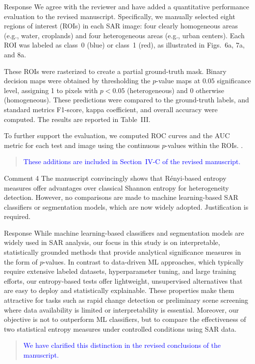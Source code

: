 \documentclass[11pt]{report}
\begin{document}
\begin{responsebox}{Response}
We agree with the reviewer and have added a quantitative performance evaluation to the revised manuscript. Specifically, we manually selected eight regions of interest (ROIs) in each SAR image: four clearly homogeneous areas (e.g., water, croplands) and four heterogeneous areas (e.g., urban centers). Each ROI was labeled as class~0 (blue) or class~1 (red), as illustrated in Figs.~6a, 7a, and 8a.

These ROIs were rasterized to create a partial ground-truth mask. Binary decision maps were obtained by thresholding the $p$-value maps at $ 0.05$ significance level, assigning 1 to pixels with $p < 0.05$ (heterogeneous) and 0 otherwise (homogeneous). These predictions were compared to the ground-truth labels, and standard metrics F1-score, kappa coefficient, and overall accuracy were computed. The results are reported in Table~III.

To further support the evaluation, we computed ROC curves and the AUC metric for each test and image using the continuous $p$-values within the ROIs. .
\begin{quote}
\textcolor{blue}{These additions are included in Section~IV-C of the revised manuscript. }
\end{quote}

\end{responsebox}



\begin{reviewbox}{Comment 4}
The manuscript convincingly shows that Rényi-based entropy measures offer advantages over classical Shannon entropy for heterogeneity detection. However, no comparisons are made to machine learning-based SAR classifiers or segmentation models, which are now widely adopted. Justification is required.
\end{reviewbox}
\begin{responsebox}{Response}
While machine learning-based classifiers and segmentation models are widely used in SAR analysis, our focus in this study is on interpretable, statistically grounded methods that provide analytical significance measures in the form of $p$-values. 
 In contrast to data-driven ML approaches, which typically require extensive labeled datasets, hyperparameter tuning, and large training efforts, our entropy-based tests offer lightweight, unsupervised alternatives that are easy to deploy and statistically explainable. These properties make them attractive for tasks such as rapid change detection or preliminary scene screening where data availability is limited or interpretability is essential. Moreover, our objective is not to outperform ML classifiers, but to compare the effectiveness of two statistical entropy measures under controlled conditions using SAR data.
\begin{quote}
\textcolor{blue}{We have clarified this distinction in the revised conclusions of the manuscript.}
\end{quote}
\end{responsebox}
\end{document}
